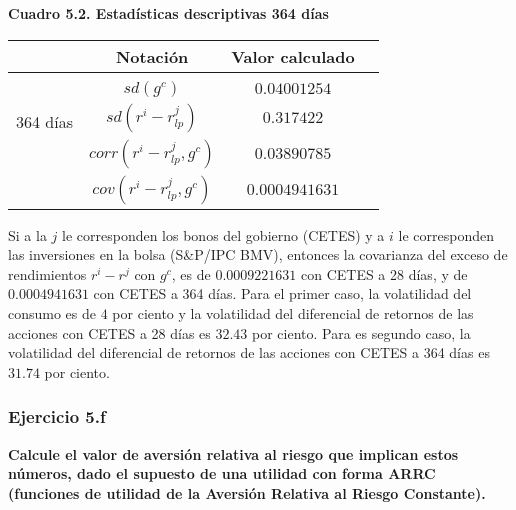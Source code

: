 \documentclass[
]{article}
\begin{document}
\begin{center}
\textbf{Cuadro 5.2. Estadísticas descriptivas 364 días}
\end{center}

\begin{table}[h!]
                \begin{center} 
                    \begin{tabular}{|c|c|c|c|} 
                        \hline 
                        \mbox{}\;\;\;\;\;\mbox{}& \; Notación\;  & \; Valor calculado\; \\ 
                        \hline 
                        \multirow{4}{*}{\begin{sideways}364 días\end{sideways}}
                        &  &   \\
                        & $sd(g^c)$  & $0.04001254$  \\ 
                        &$sd(r^i-r_{lp}^j)$ & $0.317422$ \\ 
                        &$corr(r^i-r_{lp}^j, g^c)$ & $0.03890785$ \\ 
                        &$cov(r^i-r_{lp}^j, g^c)$  & $0.0004941631$ \\                      
                        \hline \hline
                        \hline
                    \end{tabular}
                \end{center}
\end{table}

Si a la \(j\) le corresponden los bonos del gobierno (CETES) y a \(i\)
le corresponden las inversiones en la bolsa (S\&P/IPC BMV), entonces la
covarianza del exceso de rendimientos \(r^i-r^j\) con \(g^c\), es de
\(0.0009221631\) con CETES a 28 días, y de \(0.0004941631\) con CETES a
364 días. Para el primer caso, la volatilidad del consumo es de \(4\)
por ciento y la volatilidad del diferencial de retornos de las acciones
con CETES a 28 días es \(32.43\) por ciento. Para es segundo caso, la
volatilidad del diferencial de retornos de las acciones con CETES a 364
días es \(31.74\) por ciento.

\newpage

\hypertarget{ejercicio-5.f}{%
\subsubsection{Ejercicio 5.f}\label{ejercicio-5.f}}

\textbf{Calcule el valor de aversión relativa al riesgo que implican
estos números, dado el supuesto de una utilidad con forma ARRC
(funciones de utilidad de la Aversión Relativa al Riesgo Constante).}
\end{document}
